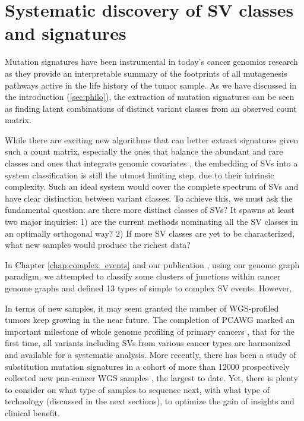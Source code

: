 \documentclass[phd,tocprelim]{cornell}
\begin{document}
\section{Systematic discovery of SV classes and signatures}
Mutation signatures have been instrumental in today's cancer genomics research as they provide an interpretable summary of the footprints of all mutagenesis pathways active in the life history of the tumor sample. As we have discussed in the introduction (\ref{sec:philo}), the extraction of mutation signatures can be seen as finding latent combinations of distinct variant classes from an observed count matrix. 

While there are exciting new algorithms that can better extract signatures given such a count matrix, especially the ones that balance the abundant and rare classes \cite{Funnell2019-ti} and ones that integrate genomic covariates \cite{Vohringer2021-bv}, the embedding of SVs into a system classification is still the utmost limiting step, due to their intrinsic complexity. Such an ideal system would cover the complete spectrum of SVs and have clear distinction between variant classes. To achieve this, we must ask the fundamental question: are there more distinct classes of SVs? It spawns at least two major inquiries: 1) are the current methods nominating all the SV classes in an optimally orthogonal way? 2) If more SV classes are yet to be characterized, what new samples would produce the richest data?



In Chapter \ref{chap:complex_events} and our publication \cite{Hadi2020-um}, using our genome graph paradigm, we attempted to classify some clusters of junctions within cancer genome graphs and defined 13 types of simple to complex SV events. However, 



In terms of new samples, it may seem granted the number of WGS-profiled tumors keep growing in the near future. The completion of PCAWG marked an important milestone of whole genome profiling of primary cancers \cite{pcawg_marker2020-yi}, that for the first time, all variants including SVs from various cancer types are harmonized and available for a systematic analysis. More recently, there has been a study of substitution mutation signatures in a cohort of more than 12000 prospectively collected new pan-cancer WGS samples \cite{Degasperi2022-am}, the largest to date. Yet, there is plenty to consider on what type of samples to sequence next, with what type of technology (discussed in the next sections), to optimize the gain of insights and clinical benefit.
\end{document}
